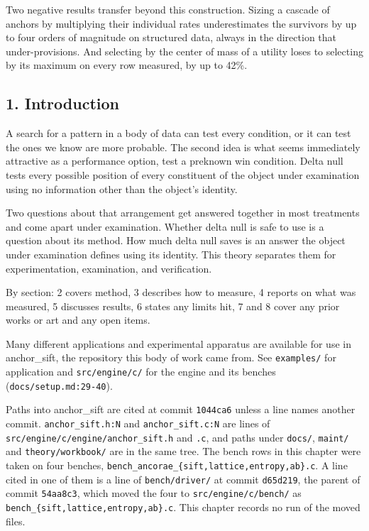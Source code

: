 Two negative results transfer beyond this construction. Sizing a cascade of anchors by multiplying their individual rates underestimates the survivors by up to four orders of magnitude on structured data, always in the direction that under-provisions. And selecting by the center of mass of a utility loses to selecting by its maximum on every row measured, by up to 42\%.

\subsection{1. Introduction}

A search for a pattern in a body of data can test every condition, or it can test the ones we know
are more probable. The second idea is what seems immediately attractive as a performance option,
test a preknown win condition. Delta null tests every possible position of every constituent of the
object under examination using no information other than the object's identity.

Two questions about that arrangement get answered together in most treatments and come apart under
examination. Whether delta null is safe to use is a question about its method. How much delta null
saves is an answer the object under examination defines using its identity. This theory separates
them for experimentation, examination, and verification.

By section: 2 covers method, 3 describes how to measure, 4 reports on what was measured, 5
discusses results, 6 states any limits hit, 7 and 8 cover any prior works or art and any open
items.

Many different applications and experimental apparatus are available for use in anchor\_sift, the
repository this body of work came from. See \texttt{examples/\allowbreak{}} for application and
\texttt{src/\allowbreak{}engine/\allowbreak{}c/\allowbreak{}} for the engine and its benches
(\texttt{docs/\allowbreak{}setup.md:29-\allowbreak{}40}).

Paths into anchor\_sift are cited at commit \texttt{1044ca6} unless a line names another commit.
\texttt{anchor\_sift.h:N} and \texttt{anchor\_sift.c:N} are lines of
\texttt{src/\allowbreak{}engine/\allowbreak{}c/\allowbreak{}engine/\allowbreak{}anchor\_sift.h} and
\texttt{.c}, and paths under \texttt{docs/\allowbreak{}}, \texttt{maint/\allowbreak{}} and
\texttt{theory/\allowbreak{}workbook/\allowbreak{}} are in the same tree. The bench rows in this
chapter were taken on four benches,
\texttt{bench\_\allowbreak{}ancorae\_\allowbreak{}\{sift,\allowbreak{}lattice,\allowbreak{}entropy,\allowbreak{}ab\}.\allowbreak{}c}.
A line cited in one of them is a line of \texttt{bench/\allowbreak{}driver/\allowbreak{}} at commit
\texttt{d65d219}, the parent of commit \texttt{54aa8c3}, which moved the four to
\texttt{src/\allowbreak{}engine/\allowbreak{}c/\allowbreak{}bench/\allowbreak{}} as
\texttt{bench\_\allowbreak{}\{sift,\allowbreak{}lattice,\allowbreak{}entropy,\allowbreak{}ab\}.\allowbreak{}c}.
This chapter records no run of the moved files.

